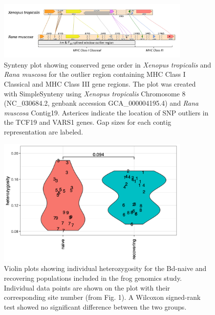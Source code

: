 \documentclass[9pt,twoside,lineno]{pnas-new}
\begin{document}
\begin{figure}

{\centering \includegraphics[width=0.85\textwidth]{figures/synteny_figure.png}

}

\caption{\label{fig-synteny-plot}Synteny plot showing conserved gene
order in \emph{Xenopus tropicalis} and \emph{Rana muscosa} for the
outlier region containing MHC Class I Classical and MHC Class III gene
regions. The plot was created with SimpleSynteny \citep{veltri2016}
using \emph{Xenopus tropicalis} Chromosome 8 (NC\_030684.2, genbank
accession GCA\_000004195.4) and \emph{Rana muscosa} Contig19. Asterices
indicate the location of SNP outliers in the TCF19 and VARS1 genes. Gap
sizes for each contig representation are labeled.}

\end{figure}\clearpage

\newpage

\begin{figure}

{\centering \includegraphics[width=0.85\textwidth]{figures/het_by_status_violin_plot.png}

}

\caption{\label{fig-violinplot-heterozy}Violin plots showing individual
heterozygosity for the Bd-naive and recovering populations included in
the frog genomics study. Individual data points are shown on the plot
with their corresponding site number (from
Fig. 1). A Wilcoxon signed-rank test showed
no significant difference between the two groups.}

\end{figure}\clearpage
\end{document}
